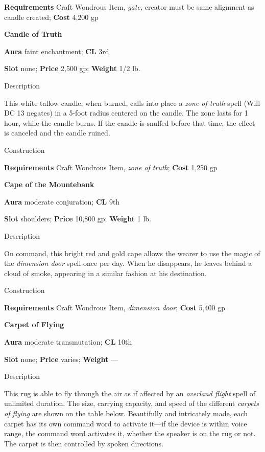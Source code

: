 \textbf{Requirements} Craft Wondrous Item, \textit{gate,} creator must be same alignment as candle created; \textbf{Cost }4,200 gp
				
\textbf{Candle of Truth}
				
\textbf{Aura} faint enchantment;\textbf{ CL }3rd
				
\textbf{Slot} none; \textbf{Price} 2,500 gp; \textbf{Weight} 1/2 lb.
				
Description
				
This white tallow candle, when burned, calls into place a \textit{zone of truth }spell (Will DC 13 negates) in a 5-foot radius centered on the candle. The zone lasts for 1 hour, while the candle burns. If the candle is snuffed before that time, the effect is canceled and the candle ruined. 
				
Construction
				
\textbf{Requirements} Craft Wondrous Item, \textit{zone of truth}; \textbf{Cost }1,250 gp
				
\textbf{Cape of the Mountebank}
				
\textbf{Aura} moderate conjuration;\textbf{ CL }9th
				
\textbf{Slot} shoulders; \textbf{Price} 10,800 gp; \textbf{Weight} 1 lb.
				
Description
				
On command, this bright red and gold cape allows the wearer to use the magic of the \textit{dimension door }spell once per day. When he disappears, he leaves behind a cloud of smoke, appearing in a similar fashion at his destination. 
				
Construction
				
\textbf{Requirements} Craft Wondrous Item, \textit{dimension door}; \textbf{Cost }5,400 gp
				
\textbf{Carpet of Flying}
				
\textbf{Aura} moderate transmutation;\textbf{ CL }10th
				
\textbf{Slot} none; \textbf{Price} varies; \textbf{Weight }---
				
Description
				
This rug is able to fly through the air as if affected by an \textit{overland flight }spell of unlimited duration. The size, carrying capacity, and speed of the different \textit{carpets of flying }are shown on the table below. Beautifully and intricately made, each carpet has its own command word to activate it---if the device is within voice range, the command word activates it, whether the speaker is on the rug or not. The carpet is then controlled by spoken directions.
				

